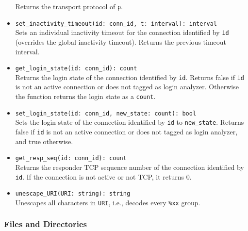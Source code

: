\documentclass[10pt,landscape]{article}
\begin{document}
\begin{multicols*}{2}
\begin{itemize}
    Returns the transport protocol of \texttt{p}.
  \item \verb|set_inactivity_timeout(id: conn_id, t: interval): interval|\\
    Sets an individual inactivity timeout for the connection identified by
    \texttt{id} (overrides the global inactivity timeout).
    Returns the previous timeout interval.
  \item \verb|get_login_state(id: conn_id): count|\\
    Returns the login state of the connection identified by \texttt{id}.
    Returns false if \texttt{id} is not an active connection or does not tagged
    as login analyzer. Otherwise the function returns the login state as
    a \texttt{count}.
  \item \verb|set_login_state(id: conn_id, new_state: count): bool|\\
    Sets the login state of the connection identified by \verb|id| to
    \verb|new_state|. Returns false if \texttt{id} is not an active connection
    or does not tagged as login analyzer, and true otherwise.
  \item \verb|get_resp_seq(id: conn_id): count|\\
    Returns the responder TCP sequence number of the connection identified by
    \texttt{id}. If the connection is not active or not TCP, it returns 0.
  \item \verb|unescape_URI(URI: string): string|\\
    Unescapes all characters in \texttt{URI}, i.e., decodes every \verb|%xx|
    group.
\end{itemize}

\subsubsection*{Files and Directories}


\end{multicols*}
\end{document}
